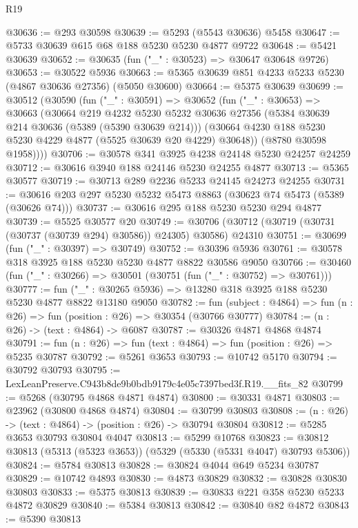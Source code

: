 \begin{lexlean}{R19}
\begin{coremodule}
@30636 := @293 @30598
@30639 := @5293 (@5543 @30636) @5458
@30647 := @5733 @30639 @615 @68 @188 @5230 @5230 @4877 @9722
@30648 := @5421 @30639
@30652 := @30635 (fun ("_" : @30523) => @30647 @30648 @9726)
@30653 := @30522 @5936
@30663 := @5365 @30639 @851 @4233 @5233 @5230 (@4867 @30636 @27356) (@5050 @30600)
@30664 := @5375 @30639
@30699 := @30512
    (@30590
      (fun ("_" : @30591) =>
      @30652
        (fun ("_" : @30653) =>
        @30663
          (@30664
            @219
            @4232
            @5230
            @5232
            @30636
            @27356
            (@5384 @30639 @214 @30636 (@5389 (@5390 @30639 @214)))
            (@30664 @4230 @188 @5230 @5230 @4229 @4877 (@5525 @30639 @20 @4229) @30648))
          (@8780 @30598 @1958))))
@30706 := @30578 @341 @3925 @4238 @24148 @5230 @24257 @24259
@30712 := @30616 @3940 @188 @24146 @5230 @24255 @4877
@30713 := @5365 @30577
@30719 := @30713 @289 @2236 @5233 @24145 @24273 @24255
@30731 := @30616 @203 @297 @5230 @5232 @5473 @8863 (@30623 @74 @5473 (@5389 (@30626 @74)))
@30737 := @30616 @295 @188 @5230 @5230 @294 @4877
@30739 := @5525 @30577 @20
@30749 := @30706 (@30712 (@30719 (@30731 (@30737 (@30739 @294) @30586)) @24305) @30586) @24310
@30751 := @30699 (fun ("_" : @30397) => @30749)
@30752 := @30396 @5936
@30761 := @30578 @318 @3925 @188 @5230 @5230 @4877 @8822 @30586 @9050
@30766 := @30460 (fun ("_" : @30266) => @30501 (@30751 (fun ("_" : @30752) => @30761)))
@30777 := fun ("_" : @30265 @5936) => @13280 @318 @3925 @188 @5230 @5230 @4877 @8822 @13180 @9050
@30782 := fun (subject : @4864) => fun (n : @26) => fun (position : @26) => @30354 (@30766 @30777)
@30784 := (n : @26) -> (text : @4864) -> @6087
@30787 := @30326 @4871 @4868 @4874
@30791 := fun (n : @26) => fun (text : @4864) => fun (position : @26) => @5235 @30787
@30792 := @5261 @3653
@30793 := @10742 @5170
@30794 := @30792 @30793
@30795 := LexLeanPreserve.C943b8de9b0bdb9179c4e05c7397bed3f.R19.__fits_82
@30799 := @5268 (@30795 @4868 @4871 @4874)
@30800 := @30331 @4871
@30803 := @23962 (@30800 @4868 @4874)
@30804 := @30799 @30803
@30808 := (n : @26) -> (text : @4864) -> (position : @26) -> @30794 @30804
@30812 := @5285 @3653 @30793 @30804 @4047
@30813 := @5299 @10768
@30823 := @30812 @30813 (@5313 (@5323 @3653)) (@5329 (@5330 (@5331 @4047) @30793 @5306))
@30824 := @5784 @30813
@30828 := @30824 @4044 @649 @5234 @30787
@30829 := @10742 @4893
@30830 := @4873 @30829
@30832 := @30828 @30830 @30803
@30833 := @5375 @30813
@30839 := @30833 @221 @358 @5230 @5233 @4872 @30829
@30840 := @5384 @30813
@30842 := @30840 @82 @4872
@30843 := @5390 @30813

\end{coremodule}
\end{lexlean}
